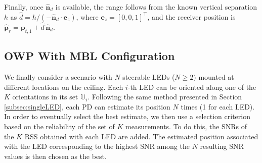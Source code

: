 \documentclass[conference]{IEEEtran}
\begin{document}
Finally, once $\hat{\mathbf n}_d$ is available, the range follows from the known vertical separation $h$ as $\hat d = h/(-\hat{\mathbf n}_d\!\cdot\!\mathbf e_z)$, where $\mathbf e_z=[0,0,1]^\top$, and the receiver position is $\hat{\mathbf p}_r=\mathbf p_{t,1}+\hat d\,\hat{\mathbf n}_d$. 

\subsection{OWP With MBL Configuration}
\label{subsec:multibeamLED}

We finally consider a scenario with $N$ steerable LEDs ($N \ge 2)$ mounted at different locations on the ceiling. Each $i$-th LED can be oriented along one of the $K$ orientations in its set $\mathbb{U}_i$. Following the same method presented in Section \ref{subsec:singleLED}, each PD can estimate its position $N$ times (1 for each LED). In order to eventually select the best estimate, we then use a selection criterion based on the reliability of the set of $K$ measurements. To do this, the SNRs of the $K$ RSS obtained with each LED are added. The estimated position associated with the LED corresponding to the highest SNR among the $N$ resulting SNR values is then chosen as the best.
\end{document}
